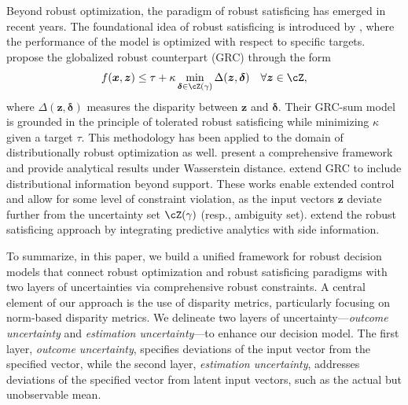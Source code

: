 \documentclass[opre, blindrev]{informs4}
\newcommand{\1}[1]{\mathds{1}{\left(#1\right)}}
\begin{document}
Beyond robust optimization, the paradigm of robust satisficing has emerged in recent years. The foundational idea of robust satisficing is introduced by \cite{Brown_Sim_2009}, where the performance of the model is optimized with respect to specific targets. \cite{BenTal_et_al_2017globalized} propose the globalized robust counterpart (GRC) through the form
$$
f(\bm x, \bm z) \leq \tau + \kappa \min_{\bm \delta \in \cZ(\gamma)} \Delta(\bm z, \bm \delta) ~~~\forall \bm z \in \cZ,
$$
where $\Delta(\bm z, \bm \delta)$ measures the disparity between $\bm z$ and $\bm \delta$. Their GRC-sum model is grounded in the principle of tolerated robust satisficing while minimizing $\kappa$ given a target $\tau$. This methodology has been applied to the domain of distributionally robust optimization as well. \cite{Long_Sim_Zhou_2023robust} present a comprehensive framework and provide analytical results under Wasserstein distance. \cite{liu2023globalized} extend GRC to include distributional information beyond support. These works enable extended control and allow for some level of constraint violation, as the input vectors $\bm z$ deviate further from the uncertainty set $\cZ(\gamma)$ (resp., ambiguity set). \cite{sim2021analytics} extend the robust satisficing approach by integrating predictive analytics with side information.

To summarize, in this paper, we build a unified framework for robust decision models that connect robust optimization and robust satisficing paradigms with two layers of uncertainties via comprehensive robust constraints. A central element of our approach is the use of disparity metrics, particularly focusing on norm-based disparity metrics. We delineate two layers of uncertainty---\emph{outcome uncertainty} and \emph{estimation uncertainty}---to enhance our decision model. The first layer, \emph{outcome uncertainty}, specifies deviations of the input vector from the specified vector, while the second layer, \emph{estimation uncertainty}, addresses deviations of the specified vector from latent input vectors, such as the actual but unobservable mean.
\end{document}
